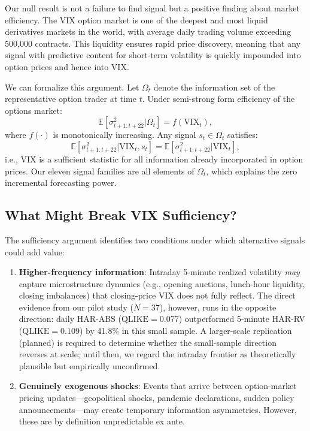 \documentclass[12pt,a4paper]{article}
\begin{document}
Our null result is not a failure to find signal but a positive finding about market efficiency. The VIX option market is one of the deepest and most liquid derivatives markets in the world, with average daily trading volume exceeding 500,000 contracts. This liquidity ensures rapid price discovery, meaning that any signal with predictive content for short-term volatility is quickly impounded into option prices and hence into VIX.

We can formalize this argument. Let $\Omega_t$ denote the information set of the representative option trader at time $t$. Under semi-strong form efficiency of the options market:
\begin{equation}
\mathbb{E}[\sigma^2_{t+1:t+22} | \Omega_t] = f(\text{VIX}_t),
\label{eq:efficiency}
\end{equation}
where $f(\cdot)$ is monotonically increasing. Any signal $s_t \in \Omega_t$ satisfies:
\begin{equation}
\mathbb{E}[\sigma^2_{t+1:t+22} | \text{VIX}_t, s_t] = \mathbb{E}[\sigma^2_{t+1:t+22} | \text{VIX}_t],
\label{eq:sufficiency}
\end{equation}
i.e., VIX is a sufficient statistic for all information already incorporated in option prices. Our eleven signal families are all elements of $\Omega_t$, which explains the zero incremental forecasting power.

\subsection{What Might Break VIX Sufficiency?}

The sufficiency argument identifies two conditions under which alternative signals could add value:

\begin{enumerate}
    \item \textbf{Higher-frequency information}: Intraday 5-minute realized volatility \emph{may} capture microstructure dynamics (e.g., opening auctions, lunch-hour liquidity, closing imbalances) that closing-price VIX does not fully reflect. The direct evidence from our pilot study ($N = 37$), however, runs in the opposite direction: daily HAR-ABS ($\text{QLIKE} = 0.077$) outperformed 5-minute HAR-RV ($\text{QLIKE} = 0.109$) by 41.8\% in this small sample. A larger-scale replication (planned) is required to determine whether the small-sample direction reverses at scale; until then, we regard the intraday frontier as theoretically plausible but empirically unconfirmed.

    \item \textbf{Genuinely exogenous shocks}: Events that arrive between option-market pricing updates---geopolitical shocks, pandemic declarations, sudden policy announcements---may create temporary information asymmetries. However, these are by definition unpredictable ex ante.
\end{enumerate}
\end{document}
